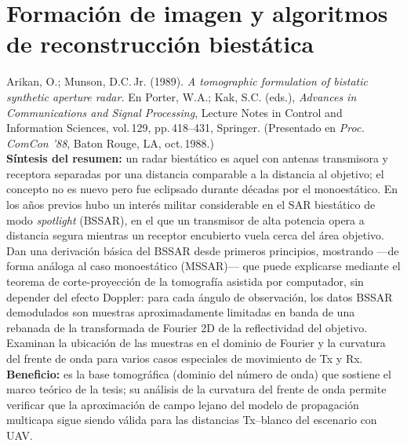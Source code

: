 \documentclass[11pt,a4paper]{report}
\begin{document}
\section{Formación de imagen y algoritmos de reconstrucción biestática}
\label{sec:algoritmos}

\begin{enumerate}[label=\textbf{[B\arabic*]}, leftmargin=2.2cm, itemsep=10pt]

\item Arikan, O.; Munson, D.C.\,Jr. (1989). \textit{A tomographic
formulation of bistatic synthetic aperture radar.} En Porter, W.A.; Kak,
S.C. (eds.), \emph{Advances in Communications and Signal Processing},
Lecture Notes in Control and Information Sciences, vol.\,129, pp.\,418--431,
Springer. (Presentado en \emph{Proc. ComCon '88}, Baton Rouge, LA, oct.\,1988.)
\cite{arikan1989}\\
\textbf{Síntesis del resumen:} un radar biestático es aquel con antenas
transmisora y receptora separadas por una distancia comparable a la
distancia al objetivo; el concepto no es nuevo pero fue eclipsado durante
décadas por el monoestático. En los años previos hubo un interés militar
considerable en el SAR biestático de modo \emph{spotlight} (BSSAR), en el
que un transmisor de alta potencia opera a distancia segura mientras un
receptor encubierto vuela cerca del área objetivo. Dan una derivación
básica del BSSAR desde primeros principios, mostrando ---de forma análoga al
caso monoestático (MSSAR)--- que puede explicarse mediante el teorema de
corte-proyección de la tomografía asistida por computador, sin depender del
efecto Doppler: para cada ángulo de observación, los datos BSSAR
demodulados son muestras aproximadamente limitadas en banda de una rebanada
de la transformada de Fourier 2D de la reflectividad del objetivo. Examinan
la ubicación de las muestras en el dominio de Fourier y la curvatura del
frente de onda para varios casos especiales de movimiento de Tx y Rx.\\
\textbf{Beneficio:} es la base tomográfica (dominio del número de onda) que
sostiene el marco teórico de la tesis; su análisis de la curvatura del
frente de onda permite verificar que la aproximación de campo lejano del
modelo de propagación multicapa sigue siendo válida para las distancias
Tx--blanco del escenario con UAV.


\end{enumerate}
\end{document}
